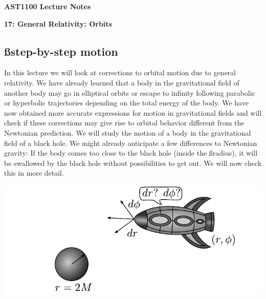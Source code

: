 




\vspace*{2cm}

{\centerline{\bf\huge AST1100 Lecture Notes}}

\vspace*{1cm}

{\centerline{\bf\LARGE 17: General Relativity: Orbits}}

\vspace*{1cm}

\begin{multicols}{2}

\section{\ss step-by-step motion}

In this lecture we will look at corrections to orbital motion due to general relativity. We have already learned that a body in the gravitational field of another body may go in elliptical orbits or escape to infinity following parabolic or hyperbolic trajectories depending on the total energy of the body. We have now obtained more accurate expressions for motion in gravitational fields and will check if these corrections may give rise to orbital behavior different from the Newtonian prediction. We will study the motion of a body in the gravitational field of a black hole. We might already anticipate a few differences to Newtonian gravity: If the body comes too close to the black hole (inside the \ss radius), it will be swallowed by the black hole without possibilities to get out. We will now check this in more detail.


\begin{Figure}
\centering
\includegraphics[width=\textwidth]{fig_17-1.pdf}
\end{Figure}


\end{multicols}
